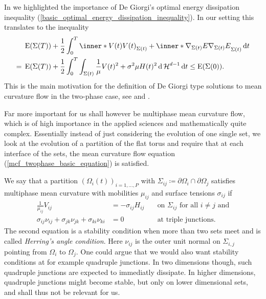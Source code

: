 In  we highlighted the importance of
De Giorgi's optimal energy dissipation inequality (\ref{basic_optimal_energy_dissipation_inequality}). In our setting  this translates to the inequality
\begin{align*}
	& \energy ( \Sigma ( T ) )
	+
	\frac{ 1 }{ 2 }
	\int_{ 0 }^{ T }
		\inner*{ V ( t ) }{ V ( t ) }_{ \Sigma ( t ) }
		+
		\inner*{ \nabla_{ \Sigma ( t ) } E }{ \nabla_{ \Sigma ( t ) } E }_{ 
		\Sigma ( t ) }
	\dd{ t }
	\\
	={}
	&\energy ( \Sigma ( T ) )
	+
	\frac{ 1 }{ 2 }
	\int_{ 0 }^{ T }
		\int_{ \Sigma (t ) }
			\frac{ 1 }{ \mu }
			V( t )^{ 2 } 
			+
			\sigma^{ 2 } \mu 
			H( t ) ^{ 2 }
		\dd{ \hm^{ d - 1 } }
	\dd{ t }
	\leq
	\energy ( \Sigma ( 0 ) ).
\end{align*}
This is the main motivation for the definition of De Giorgi type solutions to 
mean curvature flow in the two-phase case, see 
 and 
.

Far more important for us shall however be multiphase mean curvature flow, 
which is of high importance in the applied sciences and mathematically quite 
complex. 
Essentially instead of just considering the evolution of one single set, we look at the evolution of a partition of the flat torus and require that at each interface of the sets, the mean curvature flow equation (\ref{mcf_twophase_basic_equation}) is satisfied.

We say that a partition $ ( \Omega_{ i } ( t ) )_{ i = 1 , \dotsc , P } $ with 
$ \Sigma_{ i j } \coloneqq \partial \Omega_{ i } \cap \partial \Omega_{ j } $ 
satisfies multiphase mean curvature with mobilities $ \mu_{ i j } $ and surface 
tensions $ \sigma_{ i j } $ if 
\begin{align}
		\label{v_is_equal_to_h}
		\frac{ 1 }{ \mu_{ i j } }
		V_{ i j }
		& =
		-
		\sigma_{ i  j }
		H_{ i j }
		\quad
		&\text{on } \Sigma_{i j }\text{ for all }i\neq j \text{ and}
		\\
		\label{herrings_angle_condition}
			\sigma_{ i j }
			\nu_{ i j }
			+
			\sigma_{ j k }
			\nu_{ j k }
			+
			\sigma_{ k i }
			\nu_{ k i }
		& =
		0
		& \text{at triple junctions}.
\end{align}
The second equation is a stability condition when more than two sets meet and is
called \emph{Herring's angle condition}. Here $ \nu_{ i j } $ is the outer unit 
normal 
on $ \Sigma_{ i , j } $ pointing from $ \Omega_{ i } $ to $ \Omega_{ j } $. One 
could argue that we would also want stability conditions at for example 
quadruple 
junctions. In two dimensions though, such quadruple junctions are expected to 
immediatly dissipate. In higher dimensions, quadruple junctions might become 
stable, but only on lower dimensional sets, and shall thus not be relevant for 
us.

